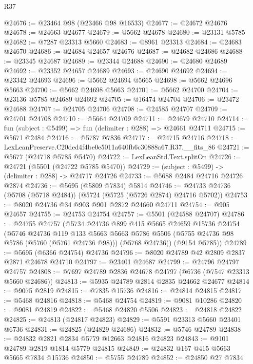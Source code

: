 \begin{lexlean}{R37}
\begin{coremodule}
@24676 := @23464 @98 (@23466 @98 @16533)
@24677 := @24672 @24676
@24678 := @24663 @24677
@24679 := @5662 @24678
@24680 := @23131 @5785
@24682 := @7287 @23313 @5660
@24683 := @8961 @23313
@24684 := @24683 @24670
@24686 := @24684 @24657 @24676
@24687 := @24682 @24686
@24688 := @23345 @24687
@24689 := @23344 @24688
@24690 := @24680 @24689
@24692 := @23352 @24657 @24689
@24693 := @24690 @24692
@24694 := @23342 @24693
@24696 := @5662 @24694 @5665
@24698 := @5662 @24696 @5663
@24700 := @5662 @24698 @5663
@24701 := @5662 @24700
@24704 := @23136 @5785 @24689 @24692
@24705 := @16474 @24704
@24706 := @23472 @24688
@24707 := @24705 @24706
@24708 := @24585 @24707
@24709 := @24701 @24708
@24710 := @5664 @24709
@24711 := @24679 @24710
@24714 := fun (subject : @5499) => fun (delimiter : @288) => @24661 @24711
@24715 := @5671 @2484
@24716 := @5787 @7836
@24717 := @24715 @24716
@24718 := LexLeanPreserve.C20ded4f4be0e5011a640fb6c30888a67.R37.__fits_86
@24721 := @5677 (@24718 @5785 @5470)
@24722 := LexLeanStd.Text.splitOn
@24726 := @24721 (@5501 (@24722 @5785 @5470))
@24729 := (subject : @5499) -> (delimiter : @288) -> @24717 @24726
@24733 := @5688 @2484 @24716 @24726 @2874
@24736 := @5695 (@5809 @7834) @5814
@24746 := @24733 @24736 (@5708 (@5718 @2484)) (@5724 (@5725 (@5726 @2874) @24716 @5702))
@24753 := @8020 @24736 @34 @903 @901 @2872 @24660 @24711
@24754 := @905 @24657
@24755 := @24753 @24754
@24757 := @5501 (@24588 @24707)
@24786 := @24755
    @24757
    (@5734
      @24736
      @899
      @415
      @5665
      @24659
      @15736
      @24754
      (@5746
        @24736
        @119
        @133
        @5663
        @5663
        @5786
        @5506
        (@5755 @24736 @98 @5786 (@5760 (@5761 @24736 @98)))
        (@5768 @24736))
      (@9154 @5785))
@24789 := @5695 (@6366 @24754) @24736
@24796 := @8020 @24789 @42 @2809 @2837 @2871 @24678 @24710
@24797 := @23401 @24687
@24799 := @24796 @24797 @24757
@24808 := @7697 @24789 @2836 @24678 @24797 (@6736 (@7547 @23313 @5660 @24686))
@24813 := @5935 @24789 @2814 @2835 @24662 @24677
@24814 := @9075 @2819
@24815 := @7835 @15736
@24816 := @24814 @24815
@24817 := @5468 @24816
@24818 := @5468 @24754
@24819 := @9081 @10286
@24820 := @9081 @24819
@24822 := @5468 @24820 @5506
@24823 := @24818 @24822
@24825 := @24813 (@24817 @24823)
@24829 := @5591 @23313 @5660 @23401 @6736
@24831 := @24825 (@24829 @24686)
@24832 := @5746 @24789
@24838 := @24832 @2821 @2834 @5779 @12663 @24816 @24823
@24843 := @9101 @24789 @2819 @1814 @5779 @24815
@24849 := @24832 @167 @415 @5663 @5665 @7834 @15736
@24850 := @5755 @24789
@24852 := @24850 @27 @7834

\end{coremodule}
\end{lexlean}
